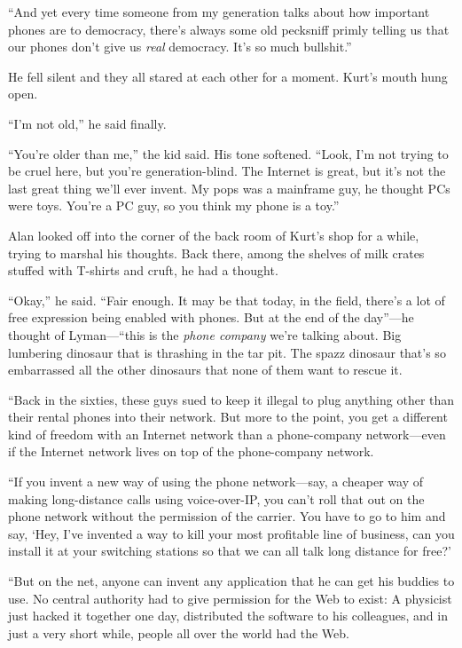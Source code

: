 ``And yet every time someone from my generation talks about how
important phones are to democracy, there's always some old pecksniff
primly telling us that our phones don't give us \textit{real}
democracy.  It's so much bullshit.''

He fell silent and they all stared at each other for a moment.  Kurt's
mouth hung open.

``I'm not old,'' he said finally.

``You're older than me,'' the kid said.  His tone softened.  ``Look,
I'm not trying to be cruel here, but you're generation-blind.  The
Internet is great, but it's not the last great thing we'll ever
invent.  My pops was a mainframe guy, he thought PCs were toys. 
You're a PC guy, so you think my phone is a toy.''

Alan looked off into the corner of the back room of Kurt's shop for a
while, trying to marshal his thoughts.  Back there, among the shelves
of milk crates stuffed with T-shirts and cruft, he had a thought.

``Okay,'' he said.  ``Fair enough.  It may be that today, in the
field, there's a lot of free expression being enabled with phones. 
But at the end of the day''---he thought of Lyman---``this is the
\textit{phone company} we're talking about.  Big lumbering dinosaur
that is thrashing in the tar pit.  The spazz dinosaur that's so
embarrassed all the other dinosaurs that none of them want to rescue
it.

``Back in the sixties, these guys sued to keep it illegal to plug
anything other than their rental phones into their network.  But more
to the point, you get a different kind of freedom with an Internet
network than a phone-company network---even if the Internet network
lives on top of the phone-company network.

``If you invent a new way of using the phone network---say, a cheaper
way of making long-distance calls using voice-over-IP, you can't roll
that out on the phone network without the permission of the carrier. 
You have to go to him and say, `Hey, I've invented a way to kill your
most profitable line of business, can you install it at your switching
stations so that we can all talk long distance for free?'

``But on the net, anyone can invent any application that he can get
his buddies to use.  No central authority had to give permission for
the Web to exist:  A physicist just hacked it together one day,
distributed the software to his colleagues, and in just a very short
while, people all over the world had the Web.

